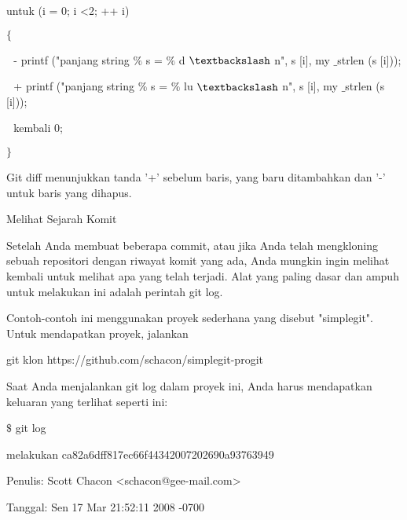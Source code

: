 \noindent 
 \hspace*{0.5in} untuk (i = 0; i <2; ++ i) \par
\noindent 
 \hspace*{0.5in}  $  \{  $ \par
\noindent 
 \hspace*{0.5in}  $  $ $  $ $  $- printf ("panjang string $  \%  $ s = $  \%  $ d  $  \textbackslash  $ n", s [i], my $  \_  $strlen (s [i])); \par
\noindent 
 \hspace*{0.5in}  $  $ $  $ $  $+ printf ("panjang string $  \%  $ s = $  \%  $ lu  $  \textbackslash  $ n", s [i], my $  \_  $strlen (s [i])); \par
\noindent 
 \hspace*{0.5in}  $  $ $  $ $  $kembali 0; \par
\noindent 
 \hspace*{0.5in}  $  \}  $ \par
\noindent 
Git diff menunjukkan tanda '+' sebelum baris, yang baru ditambahkan dan '-' untuk baris yang dihapus. \par
\noindent 
Melihat Sejarah Komit \par
\noindent 
 \hspace*{0.5in} Setelah Anda membuat beberapa commit, atau jika Anda telah mengkloning sebuah repositori dengan riwayat komit yang ada, Anda mungkin ingin melihat kembali untuk melihat apa yang telah terjadi. Alat yang paling dasar dan ampuh untuk melakukan ini adalah perintah git log. \par
\noindent 
Contoh-contoh ini menggunakan proyek sederhana yang disebut "simplegit". Untuk mendapatkan proyek, jalankan \par
\noindent 
git klon https://github.com/schacon/simplegit-progit \par
\noindent 
Saat Anda menjalankan git log dalam proyek ini, Anda harus mendapatkan keluaran yang terlihat seperti ini: \par
\noindent 
 \hspace*{0.5in}  $  \$  $ git log \par
\noindent 
 \hspace*{0.5in} melakukan ca82a6dff817ec66f44342007202690a93763949 \par
\noindent 
 \hspace*{0.5in} Penulis: Scott Chacon <schacon@gee-mail.com> \par
\noindent 
 \hspace*{0.5in} Tanggal: Sen 17 Mar 21:52:11 2008 -0700 \par
